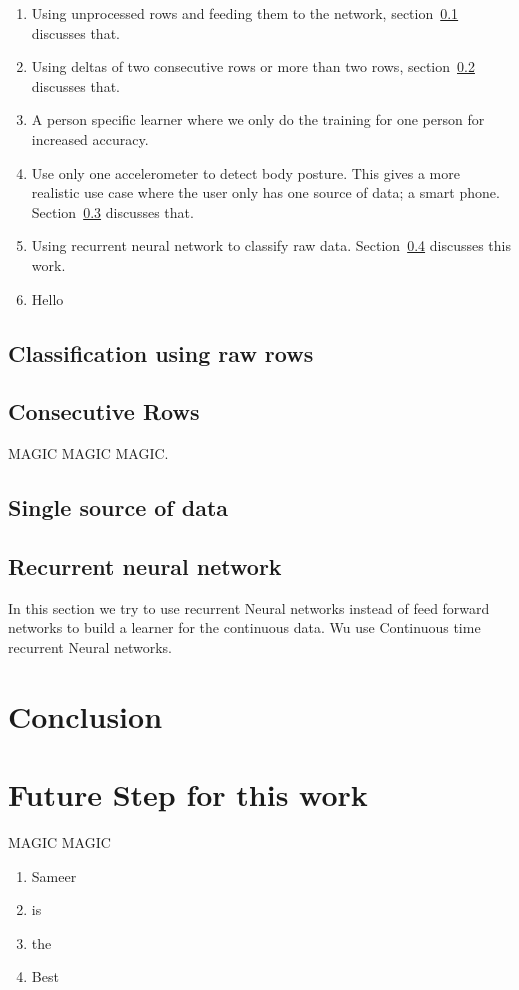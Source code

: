 \documentclass{article}
\begin{document}
\begin{enumerate}
  \item Using unprocessed rows and feeding them to the network, section~\ref{simple_rows} discusses that.
  \item Using deltas of two consecutive  rows or more than two rows, section~\ref{consecutive_rows} discusses that. 
  \item A person specific learner where we only do the training for one person for increased accuracy. 
  \item Use only one accelerometer to detect body posture. This gives a more realistic use case where the user only 
        has one source of data; a smart phone. Section~\ref{single_acc} discusses that.
  \item Using recurrent neural network to classify raw data. Section~\ref{rec_neural} discusses this work.
  \item Hello 
\end{enumerate}  

\subsection{Classification using raw rows}
\label{simple_rows}

\subsection{Consecutive Rows}
\label{consecutive_rows}
MAGIC MAGIC MAGIC.

\subsection{Single source of data} 
\label{single_acc}

\subsection{Recurrent neural network}
\label{rec_neural}

In this section we try to use recurrent Neural networks instead of feed forward 
networks to build a learner for the continuous data. Wu use Continuous time recurrent 
Neural networks.  


\section {Conclusion}
\label{conclusion}

\section{Future Step for this work}
MAGIC MAGIC 

\begin{enumerate}
  \item Sameer
  \item is  
  \item the 
  \item Best
\end{enumerate}

{}

\end{document}
